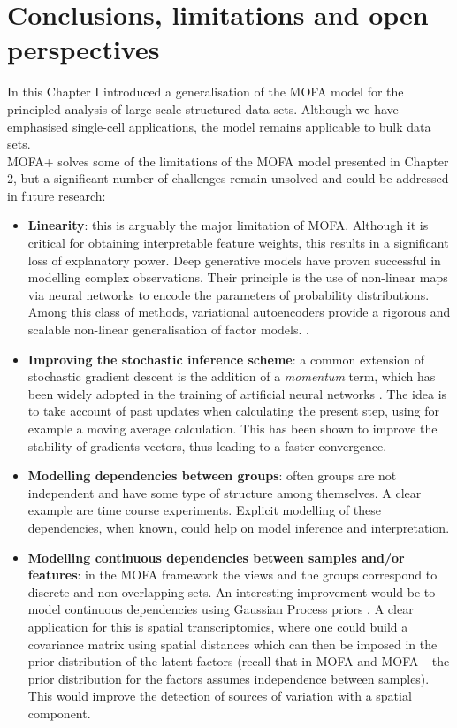 \section{Conclusions, limitations and open perspectives}

In this Chapter I introduced a generalisation of the MOFA model for the principled analysis of large-scale structured data sets. Although we have emphasised single-cell applications, the model remains applicable to bulk data sets.\\
MOFA+ solves some of the limitations of the MOFA model presented in Chapter 2, but a significant number of challenges remain unsolved and could be addressed in future research:

\begin{itemize}
	\item \textbf{Linearity}: this is arguably the major limitation of MOFA. Although it is critical for obtaining interpretable feature weights, this results in a significant loss of explanatory power. Deep generative models have proven successful in modelling complex observations. Their principle is the use of non-linear maps via neural networks to encode the parameters of probability distributions. Among this class of methods, variational autoencoders provide a rigorous and scalable non-linear generalisation of factor models. \cite{Ainsworth2018}.

	\item \textbf{Improving the stochastic inference scheme}: a common extension of stochastic gradient descent is the addition of a \textit{momentum} term, which has been widely adopted in the training of artificial neural networks \cite{Zeiler2012,Ning1999}. The idea is to take account of past updates when calculating the present step, using for example a moving average calculation. This has been shown to improve the stability of gradients vectors, thus leading to a faster convergence.

	\item \textbf{Modelling dependencies between groups}: often groups are not independent and have some type of structure among themselves. A clear example are time course experiments. Explicit modelling of these dependencies, when known, could help on model inference and interpretation.

	\item \textbf{Modelling continuous dependencies between samples and/or features}: in the MOFA framework the views and the groups correspond to discrete and non-overlapping sets. An interesting improvement would be to model continuous dependencies using Gaussian Process priors \cite{Casale2018}. A clear application for this is spatial transcriptomics, where one could build a covariance matrix using spatial distances which can then be imposed in the prior distribution of the latent factors (recall that in MOFA and MOFA+ the prior distribution for the factors assumes independence between samples). This would improve the detection of sources of variation with a spatial component.
\end{itemize}